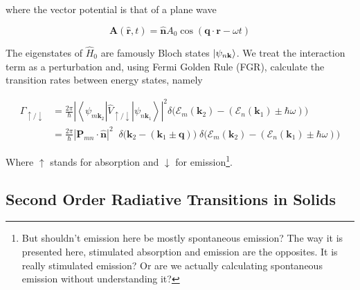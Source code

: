 where the vector potential is that of a plane wave

\begin{equation}
\mathbf{A}(\hat{\mathbf{r}},t) = \hat{\mathbf{n}}A_{0}\cos(\mathbf{q}\cdot \mathbf{r}-\omega t)
\label{eq:first_order_vector_potential}
\end{equation}

The eigenstates of $\hat{H}_{0}$ are famously Bloch states $\ket{\psi_{n\mathbf{k}}}$. We treat the interaction term as a perturbation and, using Fermi Golden Rule (FGR), calculate the transition rates between energy states, namely

\begin{align}
\Gamma_{\uparrow / \downarrow} &= \frac{2\pi}{\hbar} \left|\left\langle \psi_{m\mathbf{k}_{2}} \left| \hat{V}_{\uparrow / \downarrow} \right| \psi_{n\mathbf{k}_{1}} \right\rangle\right|^{2}\delta\Big(  \mathcal{E}_{m}(\mathbf{k}_{2}) - (\mathcal{E}_n(\mathbf{k}_{1})\pm\hbar\omega)\Big) \\
&= \frac{2\pi}{\hbar} \left|\mathbf{P}_{mn}\cdot  \hat{\mathbf{n}}\right|^{2} \; \;  \delta \Big( \mathbf{k}_{2} - (\mathbf{k}_{1}\pm\mathbf{q}) \Big)\; \delta\Big(  \mathcal{E}_{m}(\mathbf{k}_{2}) - (\mathcal{E}_n(\mathbf{k}_{1})\pm\hbar\omega)\Big) 
\label{eq:first_order_transition_rates}
\end{align}

Where $\uparrow$ stands for absorption and $\downarrow$ for emission\footnote{But shouldn't emission here be mostly spontaneous emission? The way it is presented here, stimulated absorption and emission are the opposites. It is really stimulated emission? Or are we actually calculating spontaneous emission without understanding it?}.

\subsection{Second Order Radiative Transitions in Solids}

